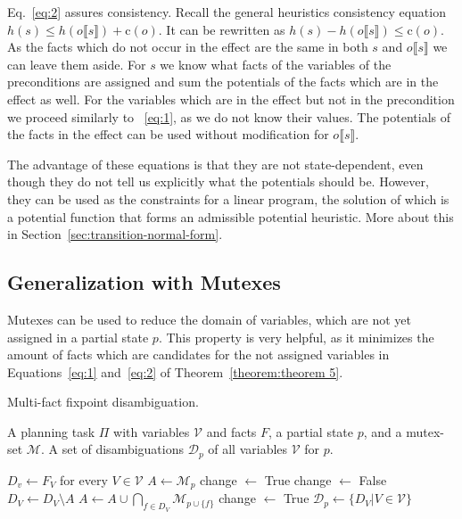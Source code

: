 Eq.~\eqref{eq:2} assures consistency.
Recall the general heuristics consistency equation $h(s)\leq h(o\llbracket s\rrbracket)+\text{c}(o)$.
It can be rewritten as $h(s)-h(o\llbracket s\rrbracket)\leq\text{c}(o)$.
As the facts which do not occur in the effect are the same in both $s$ and $o\llbracket s\rrbracket$ we can leave them aside. %
For $s$ we know what facts of the variables of the preconditions are assigned and sum the potentials of the facts which are in the effect as well.
For the variables which are in the effect but not in the precondition we proceed similarly to ~\eqref{eq:1}, as we do not know their values.
The potentials of the facts in the effect can be used without modification for  $o\llbracket s\rrbracket$.

The advantage of these equations is that they are not state-dependent, even though they do not tell us explicitly what the potentials should be.
However, they can be used as the constraints for a linear program, the solution of which is a potential function that forms an admissible potential heuristic.
More about this in Section~\ref{sec:transition-normal-form}.

\subsection{Generalization with Mutexes}\label{subsec:pot-generalize-with-mutexes}
Mutexes can be used to reduce the domain of variables, which are not yet assigned in a partial state $p$.
This property is very helpful, as it minimizes the amount of facts which are candidates for the not assigned variables in Equations~\eqref{eq:1} and~\eqref{eq:2} of Theorem~\ref{theorem:theorem 5}.

\begin{algorithm}[H]
    \caption{Multi-fact fixpoint disambiguation.}
    \label{alg:multi-fact}
    \begin{algorithmic}[1] %
        \Require A planning task $\Pi$ with variables $\mathcal{V}$ and facts $F$, a partial state $p$, and a mutex-set $\mathcal{M}$.
        \Ensure A set of disambiguations $\mathcal{D}_p$ of all variables $\mathcal{V}$ for $p$.

        \State $D_v\leftarrow F_V$ for every $V\in\mathcal{V}$\;
        \State $A\leftarrow \mathcal{M}_p$\;
        \State change $\leftarrow$ True\;
        \State change $\leftarrow$ False\;
        \State $D_V\leftarrow D_V\setminus A$\;
        \State $A\leftarrow A\cup \bigcap_{f\in D_V}\mathcal{M}_{p\cup \{f\}} $\; \label{lst:line:A}
        \State change $\leftarrow$ True\;
        \EndIf
        \EndFor
        \EndWhile
        \State $\mathcal{D}_p\leftarrow\{D_V|V\in\mathcal{V}\}$\;
    \end{algorithmic}
\end{algorithm}

